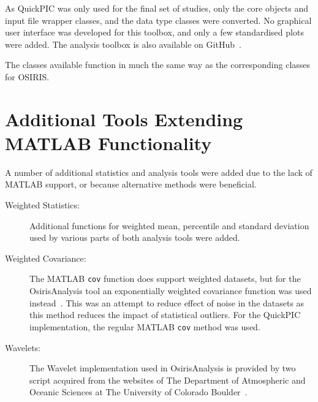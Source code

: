 As QuickPIC was only used for the final set of studies, only the core objects and input file wrapper classes, and the data type classes were converted.
No graphical user interface was developed for this toolbox, and only a few standardised plots were added.
The analysis toolbox is also available on GitHub~\cite{code:quickpic_analysis:2017}.

The classes available function in much the same way as the corresponding classes for OSIRIS.

\section{Additional Tools Extending MATLAB Functionality}
\label{Tools:OAAdd}

A number of additional statistics and analysis tools were added due to the lack of MATLAB support, or because alternative methods were beneficial.

\begin{description}
    \item[Weighted Statistics:] Additional functions for weighted mean, percentile and standard deviation used by various parts of both analysis tools were added.
    \item[Weighted Covariance:] The MATLAB \texttt{cov} function does support weighted datasets, but for the OsirisAnalysis tool an exponentially weighted covariance function was used instead~\cite{pozzi:2012}.
    This was an attempt to reduce effect of noise in the datasets as this method reduces the impact of statistical outliers.
    For the QuickPIC implementation, the regular MATLAB \texttt{cov} method was used.
    \item[Wavelets:] The Wavelet implementation used in OsirisAnalysis is provided by two script acquired from the websites of The Department of Atmospheric and Oceanic Sciences at The University of Colorado Boulder~\cite{torrence:1998}.
\end{description}
